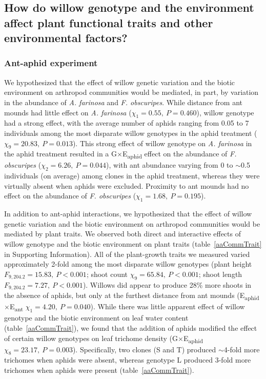 \documentclass[11pt]{article}
\begin{document}
\subsection*{How do willow genotype and the environment affect plant functional traits and other environmental factors?}

\subsubsection*{Ant-aphid experiment}

We hypothesized that the effect of willow genetic variation and the
biotic environment on arthropod communities would be mediated, in part,
by variation in the abundance of \textit{A. farinosa} and \textit{F.
obscuripes}. While distance from ant mounds had little effect on \textit{A.
farinosa} (\(\chi_1=0.55,\ P=0.460\)), willow genotype had a strong effect, with
the average number of aphids ranging from 0.05 to 7 individuals among the most
disparate willow genotypes in the aphid treatment (\(\chi_9=20.83,\ P=0.013\)).
This strong effect of willow genotype on \textit{A. farinosa} in the aphid
treatment resulted in a G$\times$E\textsubscript{aphid} effect on the abundance
of \textit{F. obscuripes} ($\chi_2=6.26, \ P=0.044$), with ant abundance varying
from 0 to $\sim$0.5 individuals (on average) among clones in
the aphid treatment, whereas they were virtually absent when aphids were excluded. Proximity to ant mounds had no effect on the abundance of
\textit{F. obscuripes} (\(\chi_1=1.68,\ P=0.195\)).

In addition to ant-aphid interactions, we hypothesized that the effect
of willow genetic variation and the biotic environment on arthropod
communities would be mediated by plant traits. We observed both direct
and interactive effects of willow genotype and the biotic environment on
plant traits (table~\ref{aaCommTrait} in Supporting Information). All of the plant-growth traits we measured
varied approximately 2-fold among the most disparate willow genotypes
(plant height \(F_{9,204.2}=15.83,\ P<0.001\); shoot count \(\chi_9=65.84,\ P<0.001\); shoot
length \(F_{9,204.2}=7.27,\ P<0.001\)). Willows did appear to produce 28\% more
shoots in the absence of aphids, but only at the furthest distance from
ant mounds (E\textsubscript{aphid}$\times$E\textsubscript{ant} $\chi_1=4.20,\ P=0.040$). While there was little apparent effect
of willow genotype and the biotic environment on leaf water content
(table~\ref{aaCommTrait}), we found that the addition of aphids modified the effect of
certain willow genotypes on leaf trichome density (G$\times$E\textsubscript{aphid} $\chi_8=23.17,\ P=0.003$).
Specifically, two clones (S and T) produced $\sim$4-fold more
trichomes when aphids were absent, whereas genotype L produced 3-fold
more trichomes when aphids were present (table~\ref{aaCommTrait}).
\end{document}
